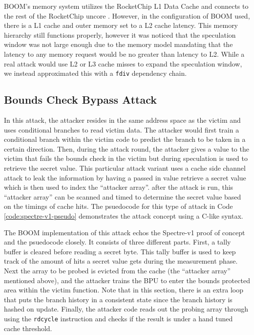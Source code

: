 
BOOM's memory system utilizes the RocketChip L1 Data Cache and connects to the rest of the RocketChip
uncore \cite{b54}. However, in the configuration of BOOM used, there is a L1 cache and outer memory set to a L2 cache
latency. This memory hierarchy still functions properly, however it was noticed that the speculation window
was not large enough due to the memory model mandating that the latency to any memory request would be no greater than latency to L2.
While a real attack would use L2 or L3 cache misses to expand the speculation window, we instead approximated this with a {\tt fdiv} dependency chain.

\subsection{Bounds Check Bypass Attack} \label{Bounds Check Bypass Attack}

In this attack, the attacker resides in the same address space as the victim and uses
conditional branches to read victim data. The attacker would first train a conditional branch
within the victim code to predict the branch to be taken in a certain direction. Then,
during the attack round, the attacker
gives a value to the victim that fails the bounds check in the victim but during
speculation is used to retrieve the secret value. This particular attack variant
uses a cache side channel attack to leak the information by having a passed in value retrieve
a secret value which is then used to index the ``attacker array''. after the attack is run, this 
``attacker array'' can be scanned and timed to determine the secret value based on the timings
of cache hits. The psuedocode for this type of attack in Code \ref{code:spectre-v1-pseudo}
demonstrates the attack concept using a C-like syntax.


The BOOM implementation of this attack echos the Spectre-v1 proof of concept and the psuedocode closely.
It consists of three different parts. First, a tally buffer is cleared before reading a secret byte.
This tally buffer is used to keep track of the amount of hits a secret value gets during the measurement
phase. Next the array to be probed is evicted from the cache (the ``attacker array'' mentioned above), and
the attacker trains the BPU to enter the bounds protected area within the victim function. Note that in
this section, there is an extra loop that puts the branch history in a consistent state since the branch
history is hashed on update. Finally, the attacker code reads out the probing array through using the
{\tt rdcycle} instruction and checks if the result is under a hand tuned cache threshold.

